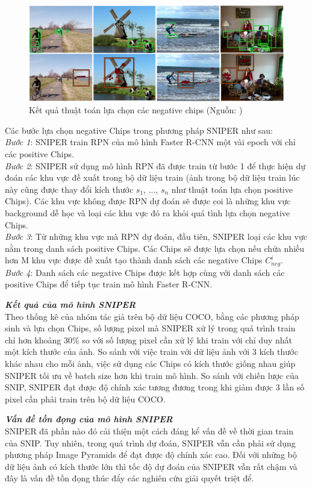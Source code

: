 {    \begin{figure}[H]
        \centering
        \includegraphics[width=13cm] {images/sniper_neg_chip}
        \caption{Kết quả thuật toán lựa chọn các negative chips (Nguồn: \cite{singh2018sniper})}
        \label{fig:sniper_pos_chip}
    \end{figure}

    \noindent
    Các bước lựa chọn negative Chips trong phương pháp SNIPER như sau: \\
    \textit{Bước 1}: SNIPER train RPN của mô hình Faster R-CNN một vài epoch với chỉ các positive Chips. \\
    \textit{Bước 2}: SNIPER sử dụng mô hình RPN đã được train từ bước 1 để thực hiện dự đoán các khu vực đề xuất trong bộ dữ liệu train (ảnh trong bộ dữ liệu train lúc này cũng được thay đổi kích thước {${s}_{1}$, ..., ${s}_{n}$} như thuật toán lựa chọn positive Chips).
    Các khu vực không được RPN dự đoán sẽ được coi là những khu vực background dễ học và loại các khu vực đó ra khỏi quá tình lựa chọn negative Chips. \\
    \textit{Bước 3}: Từ những khu vực mà RPN dự đoán, đầu tiên, SNIPER loại các khu vực nằm trong danh sách positive Chips.
    Các Chips sẽ được lựa chọn nếu chứa nhiều hơn M khu vực được đề xuất tạo thành danh sách các negative Chips ${C}_{neg}^{i}$. \\
    \textit{Bước 4}: Danh sách các negative Chips được kết hợp cùng với danh sách các positive Chips để tiếp tục train mô hình Faster R-CNN.

    \noindent
    \textbf{\textit{Kết quả của mô hình SNIPER}} \\
    Theo thống kê của nhóm tác giả trên bộ dữ liệu COCO, bằng các phương pháp sinh và lựa chọn Chips, số lượng pixel mà SNIPER xử lý trong quá trình train chỉ hơn khoảng 30\% so với số lượng pixel cần xử lý khi train với chỉ duy nhất một kích thước của ảnh.
    So sánh với việc train với dữ liệu ảnh với 3 kích thước khác nhau cho mỗi ảnh, việc sử dụng các Chips có kích thước giống nhau giúp SNIPER tối ưu về batch size hơn khi train mô hình.
    So sánh với chiến lược của SNIP, SNIPER đạt được độ chính xác tương đương trong khi giảm được 3 lần số pixel cần phải train trên bộ dữ liệu COCO.

    \noindent
    \textbf{\textit{Vấn đề tồn đọng của mô hình SNIPER}} \\
    SNIPER đã phần nào đó cải thiện một cách đáng kể vấn đề về thời gian train của SNIP.
    Tuy nhiên, trong quá trình dự đoán, SNIPER vẫn cần phải sử dụng phương pháp Image Pyramids để đạt được độ chính xác cao.
    Đối với những bộ dữ liệu ảnh có kích thước lớn thì tốc độ dự đoán của SNIPER vẫn rất chậm và đây là vấn đề tồn đọng thúc đẩy các nghiên cứu giải quyết triệt để.
}
